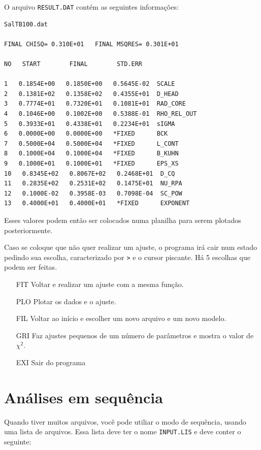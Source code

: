 \begin{apendicesenv}
O arquivo \texttt{RESULT.DAT} contém as seguintes informações:

\begin{verbatim}
SalTB100.dat

FINAL CHISQ= 0.310E+01   FINAL MSQRES= 0.301E+01

NO   START        FINAL        STD.ERR

1   0.1854E+00   0.1850E+00   0.5645E-02  SCALE               
2   0.1381E+02   0.1358E+02   0.4355E+01  D_HEAD              
3   0.7774E+01   0.7320E+01   0.1081E+01  RAD_CORE            
4   0.1046E+00   0.1002E+00   0.5388E-01  RHO_REL_OUT         
5   0.3933E+01   0.4338E+01   0.2234E+01  sIGMA               
6   0.0000E+00   0.0000E+00   *FIXED      BCK                 
7   0.5000E+04   0.5000E+04   *FIXED      L_CONT              
8   0.1000E+04   0.1000E+04   *FIXED      B_KUHN              
9   0.1000E+01   0.1000E+01   *FIXED      EPS_XS              
10   0.8345E+02   0.8067E+02   0.2468E+01  D_CQ                
11   0.2835E+02   0.2531E+02   0.1475E+01  NU_RPA              
12   0.1000E-02   0.3958E-03   0.7098E-04  SC_POW              
13   0.4000E+01   0.4000E+01   *FIXED      EXPONENT            
\end{verbatim}

Esses valores podem então ser colocados numa planilha para serem plotados posteriormente.

Caso se coloque que não quer realizar um ajuste, o programa irá cair num estado pedindo sua escolha, caracterizado por \texttt{>} e o cursor piscante. Há 5 escolhas que podem ser feitas.

\begin{itemize}
	\item[FIT] Voltar e realizar um ajuste com a mesma função.
	\item[PLO] Plotar os dados e o ajuste.
	\item[FIL] Voltar ao início e escolher um novo arquivo e um novo modelo.
	\item[GRI] Faz ajustes pequenos de um número de parâmetros e mostra o valor de \(\chi^2\).
	\item[EXI] Sair do programa
\end{itemize}

\section{Análises em sequência}
\label{sec:script_saxs_sequencia}
Quando tiver muitos arquivos, você pode utiliar o modo de sequência, usando uma lista de arquivos. Essa lista deve ter o nome \texttt{INPUT.LIS} e deve conter o seguinte:


\end{apendicesenv}
